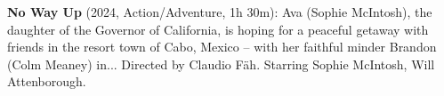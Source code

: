 \textbf{No Way Up} (2024, Action/Adventure, 1h 30m): Ava (Sophie McIntosh), the daughter of the Governor of California, is hoping for a peaceful getaway with friends in the resort town of Cabo, Mexico -- with her faithful minder Brandon (Colm Meaney) in... Directed by Claudio F\"ah. Starring Sophie McIntosh, Will Attenborough.